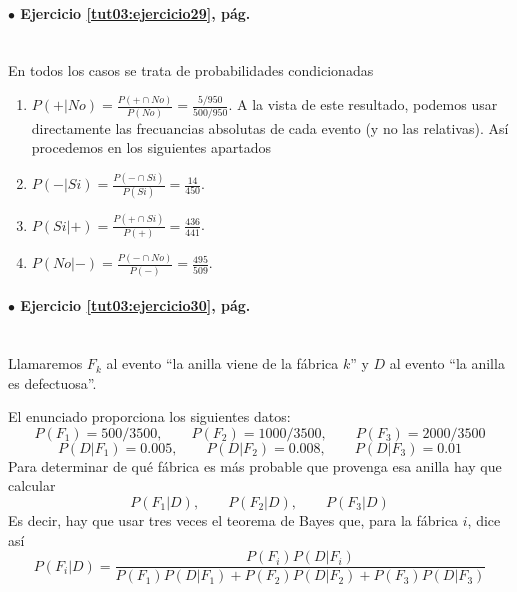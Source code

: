 \documentclass[10pt,a4paper]{article}\usepackage[]{graphicx}\usepackage[]{color}
\newcounter {cont01}
\begin{document}
\paragraph{\bf $\bullet$ Ejercicio \ref{tut03:ejercicio29}, pág. \pageref{tut03:ejercicio29}}
\label{tut03:ejercicio29:sol}\quad\\
En todos los casos se trata de probabilidades condicionadas
\begin{enumerate}
\item $ P(+|No) =\frac{P(+\cap No)} {P(No)}=\frac{5/950}{500/950} $. A la vista de este resultado, podemos usar directamente las frecuancias absolutas de cada evento (y no las relativas). Así procedemos en los siguientes apartados
\item $ P(-|Si) =\frac{P(-\cap Si)} {P(Si)}=\frac{14}{450} $.
\item $ P(Si|+) =\frac{P(+\cap Si)} {P(+)}=\frac{436}{441} $.
\item $ P(No|-) =\frac{P(-\cap No)} {P(-)}=\frac{495}{509} $.
\end{enumerate}

\paragraph{\bf $\bullet$ Ejercicio \ref{tut03:ejercicio30}, pág. \pageref{tut03:ejercicio30}}
\label{tut03:ejercicio30:sol}\quad\\
Llamaremos $F_k$ al evento ``la anilla viene de la fábrica $k$'' y $D$ al evento ``la anilla es defectuosa''.

El enunciado proporciona los siguientes datos: 
$$P(F_1)=500/3500,\qquad P(F_2)=1000/3500, \qquad P(F_3)=2000/3500 $$
$$P(D|F_1)=0\text{.}005,\qquad P(D|F_2)=0\text{.}008, \qquad P(D|F_3)=0\text{.}01$$ 
Para determinar de qu\'e fábrica es más probable que provenga esa anilla hay que calcular 
$$P(F_1|D),\qquad P(F_2|D), \qquad P(F_3|D)$$ 
Es decir, hay que usar tres veces el teorema de Bayes que, para la fábrica $i$, dice así
$$P(F_i|D) = \frac{P(F_i)P(D|F_i)}{P(F_1)P(D|F_1)+P(F_2)P(D|F_2)+P(F_3)P(D|F_3)}$$
\end{document}
